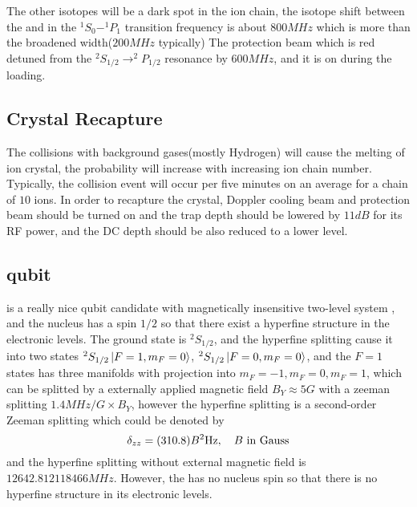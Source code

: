 The other isotopes will be a dark spot in the  ion chain, the isotope shift between the  and  in the $^1S_0-^1P_1$ transition frequency is about \emph{$800\unit{MHz}$} which is more than the broadened width($200\unit{MHz}$ typically)
The protection beam which is red detuned from the $^2S_{1/2}\rightarrow ^2P_{1/2}$ resonance by $600\unit{MHz}$, and it is on during the loading.
\subsection{Crystal Recapture} %
\label{sub:crystal_recapture}
The collisions with background gases(mostly Hydrogen) will cause the melting of ion crystal, the probability will increase with increasing ion chain number. Typically, the collision event will occur per five minutes on an average for a chain of $10$ ions. In order to recapture the crystal, Doppler cooling beam and protection beam should be turned on and the trap depth should be lowered by $11\unit{dB}$ for its RF power, and the DC depth should be also reduced to a lower level.

\subsection{ qubit} %
 is a really nice qubit candidate with magnetically insensitive two-level system
, and the nucleus has a spin $1/2$ so that there exist a hyperfine structure in the electronic levels. The ground state is $^2S_{1/2}$, and the hyperfine splitting cause it into two states $^2S_{1/2}\ket{F=1,m_F=0}$, $^2S_{1/2}\ket{F=0,m_F=0}$, and the $F=1$ states has three manifolds with projection into $m_F=-1, m_F=0, m_F=1$, which can be splitted by a externally applied magnetic field $B_Y\approx 5\unit{G}$ with a zeeman splitting $1.4\unit{MHz/G}\times B_Y$, however the hyperfine splitting is a second-order Zeeman splitting which could be denoted by
\begin{equation}\label{eq:hyperfinesplitting}
    \delta_{zz}=\qty(310.8)B^2\unit{Hz},\quad B \textrm{ in Gauss}
\end{equation}
and the hyperfine splitting without external magnetic field is $12642.812118466\unit{MHz}$. However, the  has no nucleus spin so that there is no hyperfine structure in its electronic levels.
